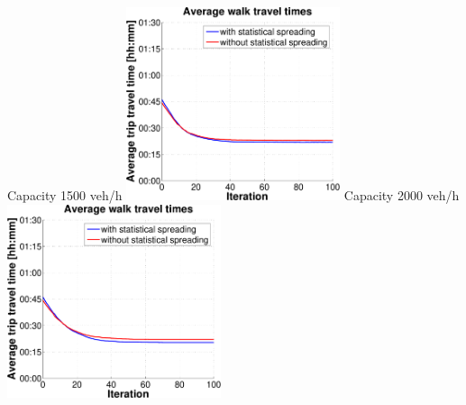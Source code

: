 {  \createsubfigure%
  {Capacity 1500 veh/h}%
  {\includegraphics[width=0.47\textwidth, angle=0, trim=0mm 0mm 0mm 9mm, clip=true]{extending/figures/MultiModalSimulation/simulations/avg_walk_traveltime_scatter_1500}}%
  {\label{}}%
  {\hspace{3mm}}%
  \createsubfigure%
  {Capacity 2000 veh/h}%
  {\includegraphics[width=0.47\textwidth, angle=0, trim=0mm 0mm 0mm 9mm, clip=true]{extending/figures/MultiModalSimulation/simulations/avg_walk_traveltime_scatter_2000}}%
  {\label{}}%
  {\vspace{7.5mm}}%

}
